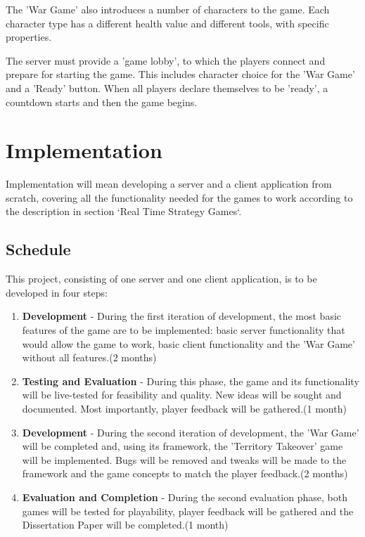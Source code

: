 \documentclass{article}
\begin{document}
The 'War Game' also introduces a number of characters to the game. Each
character type has a different health value and different tools, with specific
properties.\newline

The server must provide a 'game lobby', to which the players connect and prepare
for starting the game. This includes character choice for the 'War Game' and a
'Ready' button. When all players declare themselves to be 'ready', a countdown
starts and then the game begins.\newline

\section{Implementation}

Implementation will mean developing a server and a client application from
scratch, covering all the functionality needed for the games to work according
to the description in section `Real Time Strategy Games`.

\subsection{Schedule}
This project, consisting of one server and one client application, is to be
developed in four steps: 
\begin{enumerate}
  \item \textbf{Development} - During the first iteration of development, the
  most basic features of the game are to be implemented: basic server
  functionality that would allow the game to work, basic client functionality
  and the 'War Game' without all features.(2 months)
  \item \textbf{Testing and Evaluation} - During this phase, the game and its
  functionality will be live-tested for feasibility and quality. New ideas will
  be sought and documented. Most importantly, player feedback will be
  gathered.(1 month)
  \item \textbf{Development} - During the second iteration of development, the
  'War Game' will be completed and, using its framework, the 'Territory
  Takeover' game will be implemented. Bugs will be removed and tweaks will be
  made to the framework and the game concepts to match the player feedback.(2
  months)
  \item \textbf{Evaluation and Completion} -  During the second evaluation
  phase, both games will be tested for playability, player feedback will be
  gathered and the Dissertation Paper will be completed.(1 month)
\end{enumerate}
\end{document}
